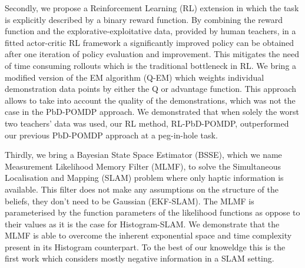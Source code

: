 Secondly, we propose a Reinforcement Learning (RL) extension in which the task is explicitly described by a binary reward 
function. By combining the reward function and the explorative-exploitative data, provided by human teachers, in 
a fitted actor-critic RL framework a significantly improved policy can be obtained after one iteration of policy evaluation
and improvement. This mitigates the need of time consuming rollouts which is the traditional bottleneck in RL.
We bring a modified version of the EM algorithm (Q-EM) which weights individual demonstration data points by 
either the Q or advantage function. This approach allows to take into account the quality of the demonstrations, which was not the case 
in the PbD-POMDP approach. We demonstrated that when solely the worst two teachers' data was used, our RL method, RL-PbD-POMDP,
outperformed our previous PbD-POMDP approach at a peg-in-hole task. 



Thirdly, we bring a Bayesian State Space Estimator (BSSE), which we name Measurement Likelihood Memory Filter (MLMF), to solve 
the Simultaneous Localisation and Mapping (SLAM) problem where only haptic information is available.
This filter does not make any assumptions on the structure of the beliefs, they don't need to be Gaussian (EKF-SLAM). The MLMF is parameterised by the function parameters of the likelihood functions as oppose
to their values as it is the case for Histogram-SLAM. We demonstrate that the MLMF  is able to overcome the inherent exponential space and 
time complexity present in its Histogram counterpart. To the best of our knoweldge this is the first 
work which considers mostly negative information in a SLAM setting.



